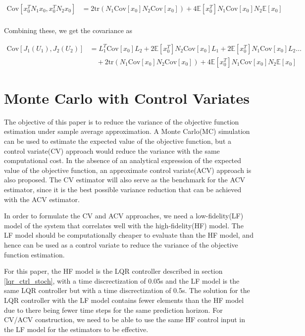 \documentclass{article}
\begin{document}
$$
\begin{aligned}
  \text{Cov}[x_0^T N_1 x_0, x_0^T N_2 x_0] &= 2 \text{tr}(N_1 \text{Cov}[x_0] N_2 \text{Cov}[x_0]) + 4 \mathbb{E}[x_0^T]N_1\text{Cov}[x_0]N_2\mathbb{E}[x_0] \\
\end{aligned}
$$

Combining these, we get the covariance as

\begin{equation}
  \begin{aligned}
    \text{Cov}[J_1(U_1), J_2(U_2)] &= L_1^T \text{Cov}[x_0] L_2 + 2 \mathbb{E}[x_0^T] N_2 \text{Cov}[x_0] L_1 + 2 \mathbb{E}[x_0^T] N_1 \text{Cov}[x_0] L_2 \hdots \\
    & \quad + 2 \text{tr}(N_1 \text{Cov}[x_0] N_2 \text{Cov}[x_0]) + 4 \mathbb{E}[x_0^T]N_1\text{Cov}[x_0]N_2\mathbb{E}[x_0]
  \end{aligned}
\end{equation}

\section{Monte Carlo with Control Variates}

The objective of this paper is to reduce the variance of the objective function estimation under sample average approximation.
A Monte Carlo(MC) simulation can be used to estimate the expected value of the objective function, but a control variate(CV) approach
would reduce the variance with the same computational cost. In the absence of an analytical expression of the expected value of the
objective function, an approximate control variate(ACV) approach is also proposed. The CV estimator will also serve as
the benchmark for the ACV estimator, since it is the best possible variance reduction that can be achieved with the ACV estimator.

In order to formulate the CV and ACV approaches, we need a low-fidelity(LF) model of the system that correlates well
with the high-fidelity(HF) model. The LF model should be computationally cheaper to evaluate than the
HF model, and hence can be used as a control variate to reduce the variance of the objective function
estimation.

For this paper, the HF model is the LQR controller described in section \ref{lqr_ctrl_stoch}, with a time
discrectization of 0.05s and the LF model is the same LQR controller but with a time discrectization of 0.5s.
The solution for the LQR controller with the LF model contains fewer elements than the HF model due to there being
fewer time steps for the same prediction horizon. For CV/ACV construction, we need to be able to use the same
HF control input in the LF model for the estimators to be effective.
\end{document}

